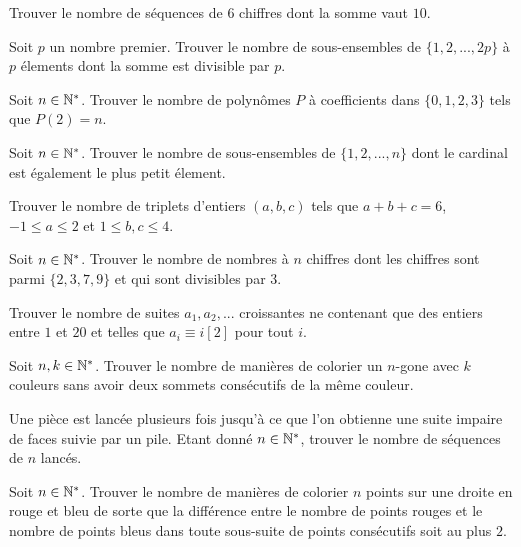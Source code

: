 \begin{exo}
Trouver le nombre de séquences de $6$ chiffres dont la somme vaut $10$.
\end{exo}

\begin{exo}
Soit $p$ un nombre premier. Trouver le nombre de sous-ensembles de $\{1,2,...,2p\}$ à $p$ élements dont la somme est divisible par $p$.
\end{exo}

\begin{exo}
Soit $n\in\mathbb N^*$. Trouver le nombre de polynômes $P$ à coefficients dans $\{0, 1, 2, 3\}$ tels que $P(2) = n$.
\end{exo}

\begin{exo}
Soit $n\in\mathbb N^*$. Trouver le nombre de sous-ensembles de $\{1,2,...,n\}$ dont le cardinal est également le plus petit élement.
\end{exo}

\begin{exo}
Trouver le nombre de triplets d'entiers $(a,b,c)$ tels que $a+b+c=6$, $-1\leq a\leq 2$ et $1\leq b,c\leq 4$.
\end{exo}

\begin{exo}
Soit $n\in\mathbb N^*$. Trouver le nombre de nombres à $n$ chiffres dont les chiffres sont parmi $\{2,3,7,9\}$ et qui sont divisibles par $3$.
\end{exo}

\begin{exo}
Trouver le nombre de suites $a_1, a_2, ...$ croissantes ne contenant que des entiers entre $1$ et $20$ et telles que $a_i\equiv i[2]$ pour tout $i$.
\end{exo}

\begin{exo}
Soit $n,k\in\mathbb N^*$. Trouver le nombre de manières de colorier un $n$-gone avec $k$ couleurs sans avoir deux sommets consécutifs de la même couleur.
\end{exo}

\begin{exo}
Une pièce est lancée plusieurs fois jusqu'à ce que l'on obtienne une suite impaire de faces suivie par un pile. Etant donné $n\in\mathbb N^*$, trouver le nombre de séquences de $n$ lancés.
\end{exo}

\begin{exo}
Soit $n\in\mathbb N^*$. Trouver le nombre de manières de colorier $n$ points sur une droite en rouge et bleu de sorte que la différence entre le nombre de points rouges et le nombre de points bleus dans toute sous-suite de points consécutifs soit au plus $2$.
\end{exo}

